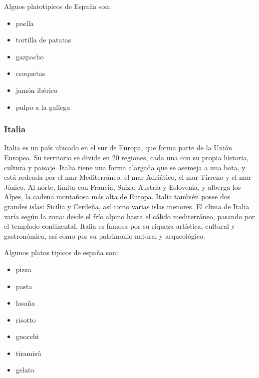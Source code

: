 \documentclass{article}
\begin{document}

Alguos platotipicos de España son:
\begin{itemize}
    \item paella
    \item tortilla de patatas
    \item gazpacho
    \item croquetas
    \item jamón ibérico
    \item pulpo a la gallega
\end{itemize}
\subsubsection{Italia}


Italia es un país ubicado en el sur de Europa, que forma parte de la Unión Europea. Su territorio se divide en 20 regiones, cada una con su propia historia, cultura y paisaje. Italia tiene una forma alargada que se asemeja a una bota, y está rodeada por el mar Mediterráneo, el mar Adriático, el mar Tirreno y el mar Jónico. Al norte, limita con Francia, Suiza, Austria y Eslovenia, y alberga los Alpes, la cadena montañosa más alta de Europa. Italia también posee dos grandes islas: Sicilia y Cerdeña, así como varias islas menores. El clima de Italia varía según la zona: desde el frío alpino hasta el cálido mediterráneo, pasando por el templado continental. Italia es famosa por su riqueza artística, cultural y gastronómica, así como por su patrimonio natural y arqueológico.

Algunos platos tipicos de españa son:
\begin{itemize}
    \item pizza
    \item pasta
    \item lasaña
    \item risotto
    \item gnocchi
    \item tiramisú
    \item gelato
\end{itemize}
\end{document}
